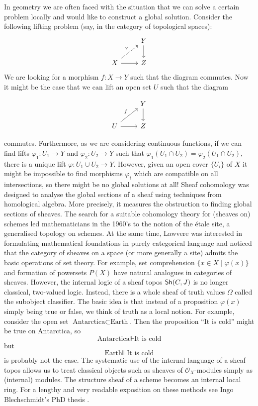 In geometry we are often faced with the situation that we can solve a certain problem locally and would like to construct a global solution. Consider the following lifting problem (say, in the category of topological spaces):
\[
	\begin{tikzcd}
		& Y\\
		X & Z
		\arrow["{?}", dashed, from=2-1, to=1-2]
		\arrow[from=1-2, to=2-2]
		\arrow[from=2-1, to=2-2]
	\end{tikzcd}
\]
We are looking for a morphism $f \colon X \to Y$ such that the diagram commutes. Now it might be the case that we can lift an open set $U$ such that the diagram

\[
	\begin{tikzcd}
		& Y\\
		U & Z
		\arrow["f",from=2-1, to=1-2]
		\arrow[from=1-2, to=2-2]
		\arrow[from=2-1, to=2-2]
	\end{tikzcd}
\]

commutes. Furthermore, as we are considering continuous functions, if we can find lifts $\varphi_1  \colon U_1 \to Y$ and $\varphi_2 \colon U_2 \to Y$ such that $\varphi_1(U_1 \cap U_2) = \varphi_2(U_1 \cap U_2)$, there is a unique lift $\varphi \colon U_1 \cup U_2 \to Y$. However, given an open cover $\{U_i\}$ of $X$ it might be impossible to find morphisms $\varphi_i$ which are compatible on all intersections, so there might be no global solutions at all! Sheaf cohomology was designed to analyse the global sections of a sheaf using techniques from homological algebra. More precisely, it measures the obstruction to finding global sections of sheaves. The search for a suitable cohomology theory for (sheaves on) schemes led mathematicians in the 1960's to the notion of the \'etale site, a generalised topology on schemes. At the same time, Lawvere was interested in formulating mathematical foundations in purely categorical language and noticed that the category of sheaves on a space (or more generally a site) admits the basic operations of set theory. For example, set comprehension $\{x \in X \mid \varphi(x)\}$ and formation of powersets $P(X)$ have natural analogues in categories of sheaves. However, the internal logic of a sheaf topos $\operatorname{\mathsf{Sh}}(C,J)$ is no longer classical, two-valued logic. Instead, there is a whole sheaf of truth values $\Omega$ called the subobject classifier. The basic idea is that instead of a proposition $\varphi(x)$ simply being true or false, we think of truth as a local notion. For example, consider the open set $\text{Antarctica} \subset \text{Earth}$. Then the proposition $\text{``It~is~cold''}$ might be true on $\text{Antarctica}$, so
\[
	\text{Antarctica} \Vdash \text{It is cold}
\]
but
\[
	\text{Earth} \Vdash \text{It is cold}
\]
is probably not the case. The systematic use of the internal language of a sheaf topos allows us to treat classical objects such as sheaves of $\mathcal{O}_X$-modules simply as (internal) modules. The structure sheaf of a scheme becomes an internal local ring. For a lengthy and very readable exposition on these methods see Ingo Blechschmidt's PhD thesis \cite{Blechschmidt}.

